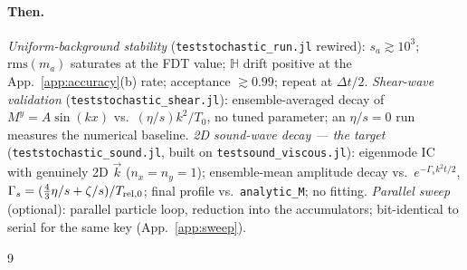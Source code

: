 \documentclass[12pt,aps,preprint,nofootinbib,noshowkeys,noshowpacs,longbibliography,superscriptaddress,tightenlines]{revtex4-2}
\def\app#1{App.~\ref{#1}}
\begin{document}
\paragraph{Then.}
\emph{Uniform-background stability} (\texttt{teststochastic\_run.jl} rewired):
$s_a\gtrsim10^3$; $\mathrm{rms}(m_a)$ saturates at the FDT value;
$\mathbb H$ drift positive at the \app{app:accuracy}(b) rate; acceptance
$\gtrsim0.99$; repeat at $\Delta t/2$.
\emph{Shear-wave validation} (\texttt{teststochastic\_shear.jl}):
ensemble-averaged decay of $M^y=A\sin(kx)$ vs.\ $(\eta/s)k^2/T_0$, no tuned
parameter; an $\eta/s=0$ run measures the numerical baseline.
\emph{2D sound-wave decay --- the target}
(\texttt{teststochastic\_sound.jl}, built on \texttt{testsound\_viscous.jl}):
eigenmode IC with genuinely 2D $\vec k$ ($n_x=n_y=1$); ensemble-mean
amplitude decay vs.\ $e^{-\Gamma_s k^2t/2}$,
$\Gamma_s=(\tfrac43\eta/s+\zeta/s)/T_{{\rm rel},0}$; final profile vs.\
\texttt{analytic\_M}; no fitting.
\emph{Parallel sweep} (optional): parallel particle loop, reduction into the
accumulators; bit-identical to serial for the same key (\app{app:sweep}).

\begin{thebibliography}{9}
\end{thebibliography}
\end{document}

